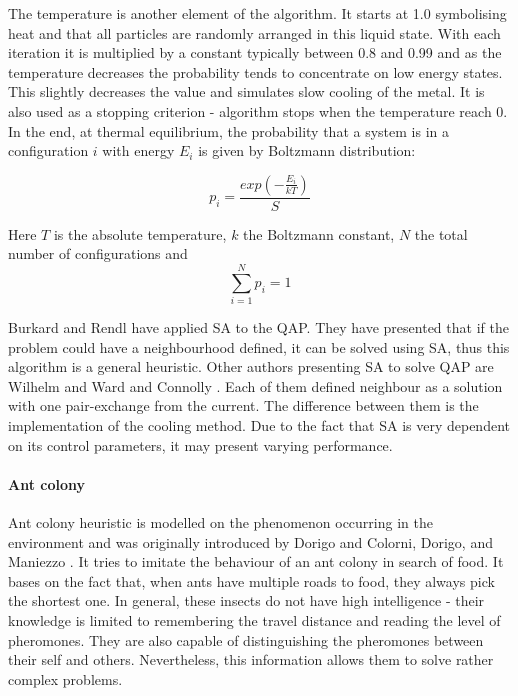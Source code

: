 The temperature is another element of the algorithm.
It starts at 1.0 symbolising heat and that all particles are randomly arranged in this liquid state.
With each iteration it is multiplied by a constant typically between 0.8 and 0.99 and as the temperature decreases the probability tends to concentrate on low energy states.
This slightly decreases the value and simulates slow cooling of the metal.
It is also used as a stopping criterion - algorithm stops when the temperature reach 0.
In the end, at thermal equilibrium, the probability that a system is in a configuration $i$ with energy $E_i$ is given by Boltzmann distribution:

\begin{equation}
  p_i = \frac{exp(-\frac{E_i}{kT})}{S}
\end{equation}

Here $T$ is the absolute temperature, $k$ the Boltzmann constant, $N$ the total number of configurations and
\begin{equation}
  \sum_{i=1}^{N} p_i = 1
\end{equation}

Burkard and Rendl \cite{burkard1984thermodynamically} have applied SA to the QAP.
They have presented that if the problem could have a neighbourhood defined, it can be solved using SA, thus this algorithm is a general heuristic.
Other authors presenting SA to solve QAP are Wilhelm and Ward \cite{wilhelm1987solving} and Connolly \cite{connolly1990improved}.
Each of them defined neighbour as a solution with one pair-exchange from the current.
The difference between them is the implementation of the cooling method.
Due to the fact that SA is very dependent on its control parameters, it may present varying performance.

\paragraph{Ant colony}

Ant colony heuristic is modelled on the phenomenon occurring in the environment and was originally introduced by Dorigo \cite{dorigo1992optimization} and Colorni, Dorigo, and Maniezzo \cite{dorigo1996ant}.
It tries to imitate the behaviour of an ant colony in search of food.
It bases on the fact that, when ants have multiple roads to food, they always pick the shortest one.
In general, these insects do not have high intelligence - their knowledge is limited to remembering the travel distance and reading the level of pheromones.
They are also capable of distinguishing the pheromones between their self and others.
Nevertheless, this information allows them to solve rather complex problems.

